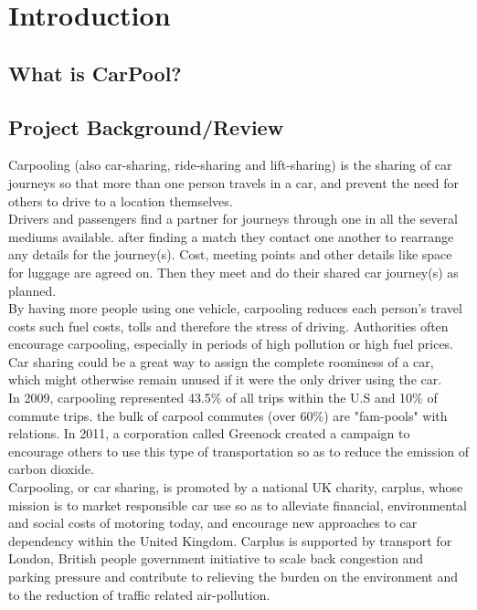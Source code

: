 \chapter{Introduction} \label{chap:intro}

\section*{What is CarPool?}

\section{Project Background/Review}
\justify
Carpooling (also car-sharing, ride-sharing and lift-sharing) is the sharing of car journeys so that more than one person travels in a car, and prevent the need for others to drive to a location themselves.\\ 

Drivers and passengers find a partner for journeys through one in all the several mediums available. after finding a match they contact one another to rearrange any details for the journey(s). Cost, meeting points and other details like space for luggage are agreed on. Then they meet and do their shared car journey(s) as planned.\\

By having more people using one vehicle, carpooling reduces each person's travel costs such fuel costs, tolls and therefore the stress of driving. Authorities often encourage carpooling, especially in periods of high pollution or high fuel prices. Car sharing could be a great way to assign the complete roominess of a car, which might otherwise remain unused if it were the only driver using the car.\\

In 2009, carpooling represented 43.5\% of all trips within the U.S and 10\% of commute trips. the bulk of carpool commutes (over 60\%) are "fam-pools" with relations. In 2011, a corporation called Greenock created a campaign to encourage others to use this type of transportation so as to reduce the emission of carbon dioxide.\\

Carpooling, or car sharing, is promoted by a national UK charity, carplus, whose mission is to market responsible car use so as to alleviate financial, environmental and social costs of motoring today, and encourage new approaches to car dependency within the United Kingdom. Carplus is supported by transport for London, British people government initiative to scale back congestion and parking pressure and contribute to relieving the burden on the environment and to the reduction of traffic related air-pollution.\\

